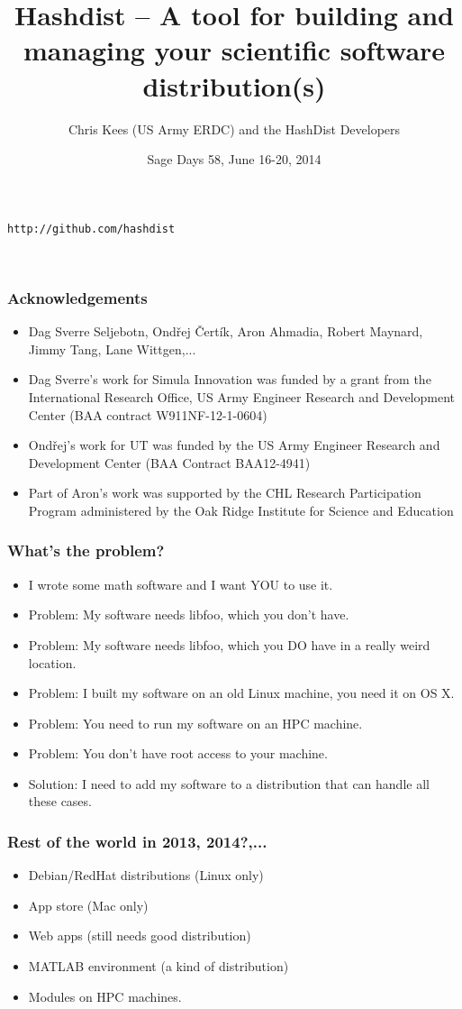 \documentclass[sans,mathserif]{beamer}
\title{Hashdist -- A tool for building and managing your scientific software distribution(s)}
\author{Chris Kees (US Army ERDC) and the HashDist Developers}
\institute{Coastal and  Hydraulics Laboratory \\ U.S. Army ERDC}
\date{Sage Days 58, June 16-20, 2014}
\begin{document}
\begin{frame}
  \titlepage

  \begin{center} {\tt http://github.com/hashdist}
  \end{center}
~
\end{frame}

\begin{frame}
  \frametitle{Acknowledgements}
\begin{itemize}
\item Dag Sverre Seljebotn, Ond\v{r}ej \v{C}ert\'{i}k, Aron Ahmadia, Robert Maynard, Jimmy Tang, Lane Wittgen,...
\item Dag Sverre's work for Simula Innovation was funded by a grant from the International Research Office, US Army Engineer Research and Development Center (BAA contract W911NF-12-1-0604)
\item Ond\v{r}ej's work for UT was funded by the US Army Engineer Research and Development Center (BAA Contract BAA12-4941) 
\item Part of Aron's work was supported by the CHL Research Participation Program administered by the Oak Ridge Institute for Science and Education
\end{itemize}
\end{frame}

\begin{frame}
\frametitle{What's the problem?}
\begin{itemize}
\item<+-> I wrote some math software and I want YOU to use it.
\item<+-> Problem: My software needs libfoo, which you don't have.
\item<+-> Problem: My software needs libfoo, which you DO have in a really weird location.
\item<+-> Problem: I built my software on an old Linux machine, you need it on OS X.
\item<+-> Problem: You need to run my software on an HPC machine.
\item<+-> Problem: You don't have root access to your machine.
\item<+-> Solution: I need to add my software to a distribution that can handle all these cases.
\end{itemize}
\end{frame}

\begin{frame}
  \frametitle{Rest of the world in 2013, 2014?,...}
  \begin{itemize}
    \item<+-> Debian/RedHat distributions (Linux only)
    \item<+-> App store (Mac only)
    \item<+-> Web apps (still needs good distribution)
    \item<+-> MATLAB environment (a kind of distribution)
    \item<+-> Modules on HPC machines.
  \end{itemize}
\end{frame}
\end{document}
